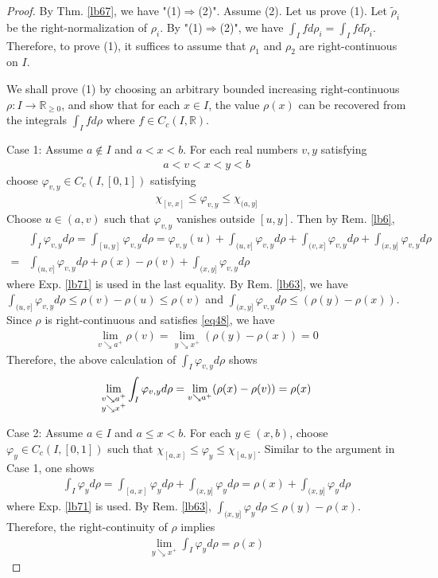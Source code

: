 \documentclass[12pt,b5paper,notitlepage]{article}
\theoremstyle{definition}
\theoremstyle{plain}
\newcommand{\wtd}{\widetilde}
\newcommand{\Rbb}{\mathbb R}
\numberwithin{equation}{section}
\begin{document}
\begin{proof}
By Thm. \ref{lb67}, we have "(1)$\Rightarrow$(2)". Assume (2). Let us prove (1). Let $\wtd\rho_i$ be the right-normalization of $\rho_i$. By "(1)$\Rightarrow$(2)", we have $\int_I fd\rho_i=\int_I fd\wtd\rho_i$. Therefore, to prove (1), it suffices to assume that $\rho_1$ and $\rho_2$ are right-continuous on $I$.

We shall prove (1) by choosing an arbitrary bounded increasing right-continuous $\rho:I\rightarrow\Rbb_{\geq0}$, and show that for each $x\in I$, the value $\rho(x)$ can be recovered from the integrals $\int_Ifd\rho$ where $f\in C_c(I,\Rbb)$.

Case 1: Assume $a\notin I$ and $a<x<b$. For each real numbers $v,y$ satisfying
\begin{align*}
a<v<x<y<b
\end{align*}
choose $\varphi_{v,y}\in C_c(I,[0,1])$ satisfying
\begin{align*}
\chi_{[v,x]}\leq\varphi_{v,y}\leq \chi_{(a,y]}
\end{align*}
Choose $u\in(a,v)$ such that $\varphi_{v,y}$ vanishes outside $[u,y]$. Then by Rem. \ref{lb6},
\begin{align*}
&\int_I\varphi_{v,y}d\rho=\int_{[u,y]}\varphi_{v,y}d\rho=\varphi_{v,y}(u)+\int_{(u,v]}\varphi_{v,y}d\rho+\int_{(v,x]}\varphi_{v,y}d\rho+\int_{(x,y]}\varphi_{v,y}d\rho\\
=&\int_{(u,v]}\varphi_{v,y}d\rho+\rho(x)-\rho(v)+\int_{(x,y]}\varphi_{v,y}d\rho
\end{align*}
where Exp. \ref{lb71} is used in the last equality. By Rem. \ref{lb63}, we have $\int_{(u,v]}\varphi_{v,y}d\rho\leq \rho(v)-\rho(u)\leq\rho(v)$ and $\int_{(x,y]}\varphi_{v,y}d\rho\leq (\rho(y)-\rho(x))$. Since $\rho$ is right-continuous and satisfies \eqref{eq48}, we have
\begin{align*}
\lim_{v\searrow a^+}\rho(v)=\lim_{y\searrow x^+}(\rho(y)-\rho(x))=0
\end{align*}
Therefore, the above calculation of $\int_I\varphi_{v,y}d\rho$ shows
\begin{align*}
\lim_{
\begin{subarray}{c}
v\searrow a^+\\
y\searrow x^+
\end{subarray}}
\int_I \varphi_{v,y}d\rho=\lim_{v\searrow a^+}(\rho(x)-\rho(v))=\rho(x)
\end{align*}



Case 2: Assume $a\in I$ and $a\leq x<b$. For each $y\in(x,b)$, choose $\varphi_y\in C_c(I,[0,1])$ such that $\chi_{[a,x]}\leq\varphi_y\leq\chi_{[a,y]}$. Similar to the argument in Case 1, one shows
\begin{align*}
\int_I\varphi_yd\rho=\int_{[a,x]}\varphi_yd\rho+\int_{(x,y]}\varphi_yd\rho=\rho(x)+\int_{(x,y]}\varphi_yd\rho
\end{align*}
where Exp. \ref{lb71} is used. By Rem. \ref{lb63}, $\int_{(x,y]}\varphi_yd\rho\leq \rho(y)-\rho(x)$. Therefore, the right-continuity of $\rho$ implies
\begin{align*}
\lim_{y\searrow x^+}\int_I \varphi_yd\rho=\rho(x)
\end{align*}



\end{proof}
\end{document}
